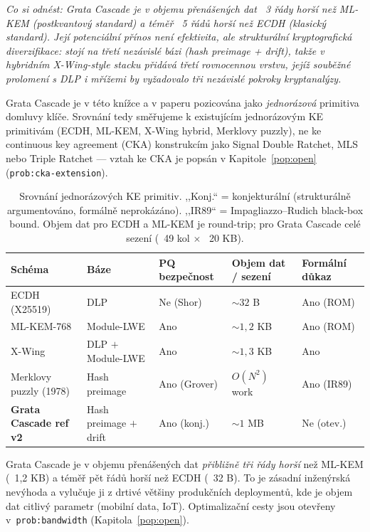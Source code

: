 \documentclass[11pt,a4paper]{article}
\begin{document}
\noindent\textit{Co si odnést: Grata Cascade je v objemu přenášených dat ~3 řády horší než ML-KEM (postkvantový standard) a téměř ~5 řádů horší než ECDH (klasický standard). Její potenciální přínos není efektivita, ale \emph{strukturální kryptografická diverzifikace}: stojí na třetí nezávislé bázi (hash preimage + drift), takže v hybridním X-Wing-style stacku přidává třetí rovnocennou vrstvu, jejíž souběžné prolomení s DLP \emph{i} mřížemi by vyžadovalo tři nezávislé pokroky kryptanalýzy.}

\medskip

Grata Cascade je v této knížce a v paperu pozicována jako \emph{jednorázová} primitiva domluvy klíče. Srovnání tedy směřujeme k existujícím jednorázovým KE primitivám (ECDH, ML-KEM, X-Wing hybrid, Merklovy puzzly), ne ke continuous key agreement (CKA) konstrukcím jako Signal Double Ratchet, MLS nebo Triple Ratchet --- vztah ke CKA je popsán v Kapitole~\ref{pop:open} (\texttt{prob:cka-extension}).

\begin{table}[ht]
\centering
\small
\begin{tabular}{lllll}
\toprule
Schéma & Báze & PQ bezpečnost & Objem dat / sezení & Formální důkaz \\
\midrule
ECDH (X25519) & DLP & Ne (Shor) & $\sim 32$ B & Ano (ROM) \\
ML-KEM-768 & Module-LWE & Ano & $\sim 1{,}2$ KB & Ano (ROM) \\
X-Wing & DLP $+$ Module-LWE & Ano & $\sim 1{,}3$ KB & Ano \\
Merklovy puzzly (1978) & Hash preimage & Ano (Grover) & $O(N^2)$ work & Ano (IR89) \\
\textbf{Grata Cascade ref v2} & Hash preimage $+$ drift & Ano (konj.) & $\sim 1$ MB & Ne (otev.) \\
\bottomrule
\end{tabular}
\caption{Srovnání jednorázových KE primitiv. ,,Konj.`` = konjekturální (strukturálně argumentováno, formálně neprokázáno). ,,IR89`` = Impagliazzo--Rudich black-box bound. Objem dat pro ECDH a ML-KEM je round-trip; pro Grata Cascade celé sezení (~49 kol $\times$ ~20 KB).}
\label{tab:pop-comparison}
\end{table}

Grata Cascade je v objemu přenášených dat \emph{přibližně tři řády horší} než ML-KEM (~1,2 KB) a téměř pět řádů horší než ECDH (~32 B). To je zásadní inženýrská nevýhoda a vylučuje ji z drtivé většiny produkčních deploymentů, kde je objem dat citlivý parametr (mobilní data, IoT). Optimalizační cesty jsou otevřeny v~\texttt{prob:bandwidth} (Kapitola~\ref{pop:open}).
\end{document}
